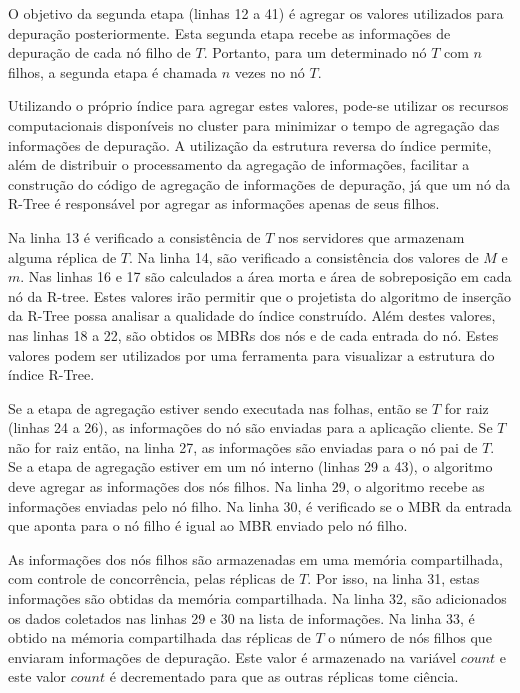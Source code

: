 O objetivo da segunda etapa (linhas 12 a 41) é agregar os valores utilizados para depuração posteriormente. Esta segunda etapa recebe as informações de depuração de cada nó filho de $T$. Portanto, para um determinado nó $T$ com $n$ filhos, a segunda etapa é chamada $n$ vezes no nó $T$.

Utilizando o próprio índice para agregar estes valores, pode-se utilizar os recursos computacionais disponíveis no cluster para minimizar o tempo de agregação das informações de depuração. A utilização da estrutura reversa do índice permite, além de distribuir o processamento da agregação de informações, facilitar a construção do código de agregação de informações de depuração, já que um nó da R-Tree é responsável por agregar as informações apenas de seus filhos. 

Na linha 13 é verificado a consistência de $T$ nos servidores que armazenam alguma réplica de $T$. Na linha 14, são verificado a consistência dos valores de $M$ e $m$. Nas linhas 16 e 17 são calculados a área morta e área de sobreposição em cada nó da R-tree. Estes valores irão permitir que o projetista do algoritmo de inserção da R-Tree possa analisar a qualidade do índice construído. Além destes valores, nas linhas 18 a 22, são obtidos os MBRs dos nós e de cada entrada do nó. Estes valores podem ser utilizados por uma ferramenta para visualizar a estrutura do índice R-Tree.

	Se a etapa de agregação estiver sendo executada nas folhas, então se $T$ for raiz (linhas 24 a 26), as informações do nó são enviadas para a aplicação cliente. Se $T$ não for raiz então, na linha 27, as informações são enviadas para o nó pai de $T$. Se a etapa de agregação estiver em um nó interno (linhas 29 a 43), o algoritmo deve agregar as informações dos nós filhos. Na linha 29, o algoritmo recebe as informações enviadas pelo nó filho. Na linha 30, é verificado se o MBR da entrada que aponta para o nó filho é igual ao MBR enviado pelo nó filho. 
	
	As informações dos nós filhos são armazenadas em uma memória compartilhada, com controle de concorrência, pelas réplicas de $T$. Por isso, na linha 31, estas informações são obtidas da memória compartilhada. Na linha 32, são adicionados os dados coletados nas linhas 29 e 30 na lista de informações. Na linha 33, é obtido na mémoria compartilhada das réplicas de $T$ o número de nós filhos que enviaram informações de depuração. Este valor é armazenado na variável $count$ e este valor $count$ é decrementado para que as outras réplicas tome ciência. 
	
